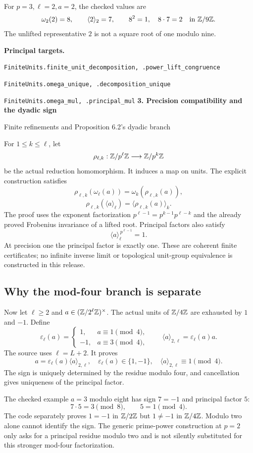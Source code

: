 \documentclass[11pt]{article}
\newcommand{\target}[1]{{\footnotesize\texttt{#1}}}
\newcommand{\pageheading}[2]{{\Large\bfseries\color{ink}#1}\par{\small #2}\par\medskip}
\begin{document}
For $p=3,\ell=2,a=2$, the checked values are
\[
 \omega_2(2)=8,\qquad \langle2\rangle_2=7,\qquad
 8^2=1,\quad8\cdot7=2\quad\text{in }\mathbb Z/9\mathbb Z.
\]
The unlifted representative $2$ is not a square root of one modulo nine.

\textbf{Principal targets.}\par
\target{FiniteUnits.finite\_unit\_decomposition, .power\_lift\_congruence}\par
\target{FiniteUnits.omega\_unique, .decomposition\_unique}\par
\target{FiniteUnits.omega\_mul, .principal\_mul}
\newpage
\pageheading{3. Precision compatibility and the dyadic sign}{Finite refinements and Proposition 6.2's dyadic branch}
For $1\leq k\leq\ell$, let
\[
 \rho_{\ell,k}:\mathbb Z/p^\ell\mathbb Z\longrightarrow\mathbb Z/p^k\mathbb Z
\]
be the actual reduction homomorphism. It induces a map on units. The explicit construction satisfies
\[
 \boxed{\rho_{\ell,k}(\omega_\ell(a))
 =\omega_k(\rho_{\ell,k}(a)),}
\]
\[
 \boxed{\rho_{\ell,k}(\langle a\rangle_\ell)
 =\langle\rho_{\ell,k}(a)\rangle_k.}
\]
The proof uses the exponent factorization
$p^{\ell-1}=p^{k-1}p^{\ell-k}$ and the already proved Frobenius invariance of a lifted root. Principal factors also satisfy
\[
 \langle a\rangle_\ell^{\,p^{\ell-1}}=1.
\]
At precision one the principal factor is exactly one. These are coherent finite certificates; no infinite inverse limit or topological unit-group equivalence is constructed in this release.

\subsection*{Why the mod-four branch is separate}
Now let $\ell\geq2$ and $a\in(\mathbb Z/2^\ell\mathbb Z)^\times$. The actual units of $\mathbb Z/4\mathbb Z$ are exhausted by $1$ and $-1$. Define
\[
 \varepsilon_\ell(a)=
 \begin{cases}1,&a\equiv1\pmod4,\\-1,&a\equiv3\pmod4,\end{cases}
 \qquad
 \langle a\rangle_{2,\ell}=\varepsilon_\ell(a)a.
\]
The source uses $\ell=L+2$. It proves
\[
 \boxed{a=\varepsilon_\ell(a)\langle a\rangle_{2,\ell},\quad
 \varepsilon_\ell(a)\in\{1,-1\},\quad
 \langle a\rangle_{2,\ell}\equiv1\pmod4.}
\]
The sign is uniquely determined by the residue modulo four, and cancellation gives uniqueness of the principal factor.

The checked example $a=3$ modulo eight has sign $7=-1$ and principal factor $5$:
\[
 7\cdot5=3\pmod8,\qquad5=1\pmod4.
\]
The code separately proves $1=-1$ in $\mathbb Z/2\mathbb Z$ but $1\neq-1$ in $\mathbb Z/4\mathbb Z$. Modulo two alone cannot identify the sign. The generic prime-power construction at $p=2$ only asks for a principal residue modulo two and is not silently substituted for this stronger mod-four factorization.
\end{document}
